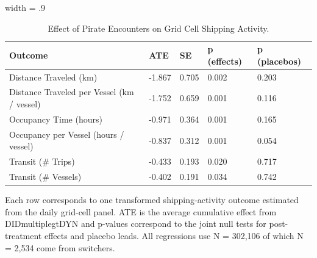 \begin{table}
\centering
\caption{Effect of Pirate Encounters on Grid Cell Shipping Activity. \label{tab:grid-level-did-multiplegt-dyn-summary-rev}}
\centering
\begin{adjustbox}{width = .9\textwidth}
\begin{threeparttable}
\begin{tabular}[t]{lllll}
\toprule
Outcome & ATE & SE & p (effects) & p (placebos)\\
\midrule
Distance Traveled (km) & -1.867 & 0.705 & 0.002 & 0.203\\
Distance Traveled per Vessel (km / vessel) & -1.752 & 0.659 & 0.001 & 0.116\\
Occupancy Time (hours) & -0.971 & 0.364 & 0.001 & 0.165\\
Occupancy per Vessel (hours / vessel) & -0.837 & 0.312 & 0.001 & 0.054\\
Transit (\# Trips) & -0.433 & 0.193 & 0.020 & 0.717\\
Transit (\# Vessels) & -0.402 & 0.191 & 0.034 & 0.742\\
\bottomrule
\end{tabular}
\begin{tablenotes}
\item \scriptsize Each row corresponds to one transformed shipping-activity outcome estimated from the daily grid-cell panel. ATE is the average cumulative effect from DIDmultiplegtDYN and p-values correspond to the joint null tests for post-treatment effects and placebo leads. All regressions use N = 302,106 of which N = 2,534 come from switchers.
\end{tablenotes}
\end{threeparttable}
\end{adjustbox}
\end{table}
